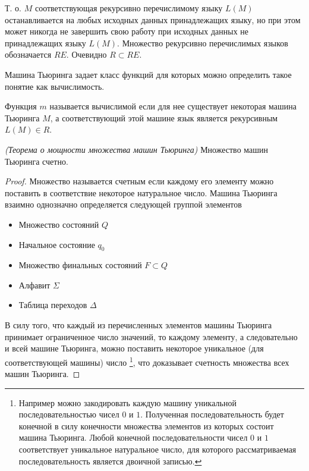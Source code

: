 Т. о. $M$ соответствующая рекурсивно перечислимому языку $L\left(M\right)$ 
останавливается на любых исходных данных принадлежащих языку, но при
этом может никогда не завершить свою работу при исходных данных не
принадлежащих языку $L\left(M\right)$. Множество рекурсивно
перечислимых языков обозначается $RE$. Очевидно  $R \subset RE$.

Машина Тьюринга задает класс функций для которых можно определить
такое понятие как вычислимость. 

\begin{definition}
Функция $m$ называется вычислимой если для нее существует некоторая
машина Тьюринга $M$, а соответствующий этой машине язык является
рекурсивным $L\left(M\right) \in R$. 
\end{definition}

\begin{theorem}
\emph{(Теорема о мощности множества машин Тьюринга)}
Множество машин Тьюринга счетно.
\label{theoremAddAlgoTuringCountability}
\end{theorem}

\begin{proof}
Множество называется счетным если каждому его элементу можно поставить
в соответствие некоторое натуральное число. 
Машина Тьюринга взаимно однозначно определяется следующей группой элементов
\begin{itemize}
\item Множество состояний $Q$
\item Начальное состояние $q_0$
\item Множество финальных состояний $F \subset Q$
\item Алфавит $\Sigma$
\item Таблица переходов $\Delta$
\end{itemize}

В силу того, что каждый из перечисленных элементов машины Тьюринга
принимает ограниченное число значений, то каждому элементу, а
следовательно и всей машине Тьюринга, можно поставить некоторое
уникальное (для соответствующей машины) число
\footnote{
Например можно закодировать каждую машину уникальной
последовательностью чисел $0$ и $1$. Полученная последовательность
будет конечной в силу конечности множества элементов из которых
состоит машина Тьюринга. Любой конечной последовательности чисел $0$ и
$1$ соответствует уникальное натуральное число, для которого
рассматриваемая последовательность является двоичной записью. 
}, что доказывает счетность
множества всех машин Тьюринга.
\end{proof}

